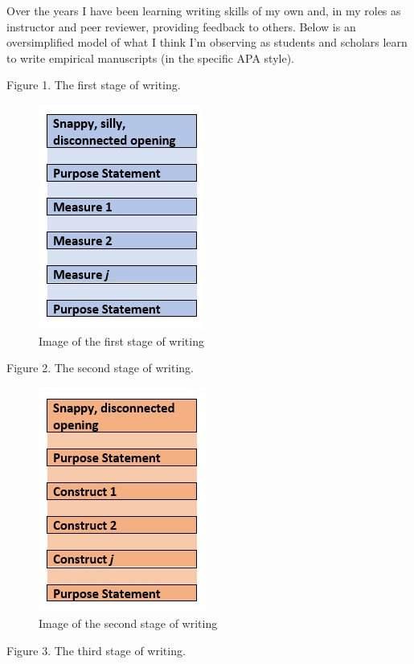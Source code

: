 \documentclass[
  english,
]{book}
\begin{document}
Over the years I have been learning writing skills of my own and, in my roles as instructor and peer reviewer, providing feedback to others. Below is an oversimplified model of what I think I'm observing as students and scholars learn to write empirical manuscripts (in the specific APA style).

Figure 1. The first stage of writing.

\begin{figure}
\centering
\includegraphics{images/APAstyle/Stage1.jpg}
\caption{Image of the first stage of writing}
\end{figure}

Figure 2. The second stage of writing.

\begin{figure}
\centering
\includegraphics{images/APAstyle/Stage2.jpg}
\caption{Image of the second stage of writing}
\end{figure}

Figure 3. The third stage of writing.
\end{document}
